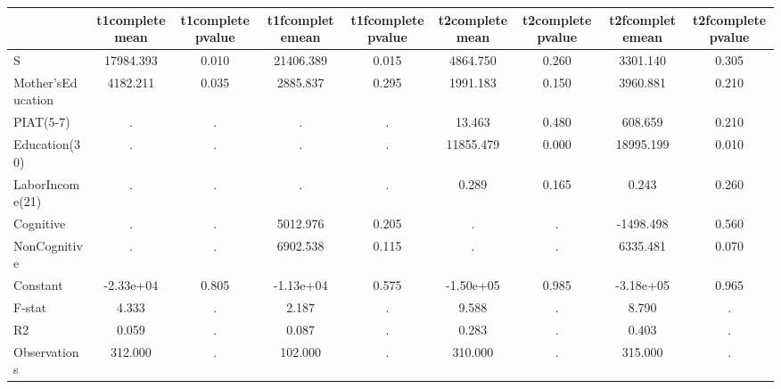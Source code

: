 \begin{table}[htbp]
\begin{tabular}{lcccccccc} \hline \hline
 & t1completemean  & t1completepvalue  & t1fcompletemean  & t1fcompletepvalue  & t2completemean  & t2completepvalue  & t2fcompletemean  & t2fcompletepvalue  \\  \hline 
S & 17984.393 &     0.010 & 21406.389 &     0.015 &  4864.750 &     0.260 &  3301.140 &     0.305 \\  
Mother'sEducation &  4182.211 &     0.035 &  2885.837 &     0.295 &  1991.183 &     0.150 &  3960.881 &     0.210 \\  
PIAT(5-7) &         . &         . &         . &         . &    13.463 &     0.480 &   608.659 &     0.210 \\  
Education(30) &         . &         . &         . &         . & 11855.479 &     0.000 & 18995.199 &     0.010 \\  
LaborIncome(21) &         . &         . &         . &         . &     0.289 &     0.165 &     0.243 &     0.260 \\  
Cognitive &         . &         . &  5012.976 &     0.205 &         . &         . & -1498.498 &     0.560 \\  
NonCognitive &         . &         . &  6902.538 &     0.115 &         . &         . &  6335.481 &     0.070 \\  
Constant & -2.33e+04 &     0.805 & -1.13e+04 &     0.575 & -1.50e+05 &     0.985 & -3.18e+05 &     0.965 \\  
F-stat &     4.333 &         . &     2.187 &         . &     9.588 &         . &     8.790 &         . \\  
R2 &     0.059 &         . &     0.087 &         . &     0.283 &         . &     0.403 &         . \\  
Observations &   312.000 &         . &   102.000 &         . &   310.000 &         . &   315.000 &         . \\  
\hline \hline \end{tabular}
\end{table}
